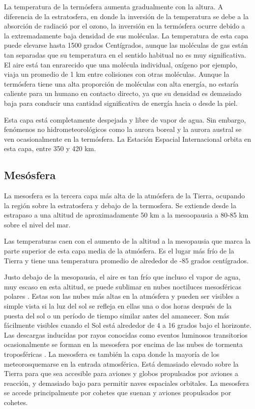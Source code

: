 \documentclass[12pt]{article}
\begin{document}
La temperatura de la termósfera aumenta gradualmente con la altura. A diferencia de la estratosfera, en donde la inversión de la temperatura se debe a la absorción de radiació por el ozono, la inversión en la termósfera  ocurre debido a la extremadamente baja densidad de sus moléculas. La temperatura de esta capa puede elevarse hasta 1500 grados Centígrados, aunque las moléculas de gas están tan separadas que su temperatura en el sentido habitual no es muy significativa. El aire está tan enrarecido que una molécula individual, oxígeno por ejemplo,  viaja un promedio de 1 km entre colisiones con otras moléculas. Aunque la termósfera tiene una alta proporción de moléculas con alta energía, no estaría caliente para un humano en contacto directo, ya que su densidad es demasiado baja para conducir una cantidad significativa de energía hacia o desde la piel.

Esta capa está completamente despejada y libre de vapor de agua. Sin embargo, fenómenos no hidrometeorológicos como la aurora boreal y la aurora austral se ven ocasionalmente en la termósfera. La Estación Espacial Internacional orbita en esta capa, entre 350 y 420 km.

\subsection{Mesósfera}

La mesosfera es la tercera capa más alta de la atmósfera de la Tierra, ocupando la región sobre la estratosfera y debajo de la termosfera. Se extiende desde la estrapaso a una altitud de aproximadamente 50 km a la mesoopausia a 80-85 km sobre el nivel del mar.

Las temperaturas caen con el aumento de la altitud a la mesopausia que marca la parte superior de esta capa media de la atmósfera. Es el lugar más frío de la Tierra y tiene una temperatura promedio de alrededor de -85 grados centígrados.

Justo debajo de la mesopausia, el aire es tan frío que incluso el vapor de agua, muy escaso en esta altitud, se puede sublimar en nubes noctiluces mesosféricas polares . Estas son las nubes más altas en la atmósfera y pueden ser visibles a simple vista si la luz del sol se refleja en ellas una o dos horas después de la puesta del sol o un período de tiempo similar antes del amanecer. Son más fácilmente visibles cuando el Sol está alrededor de 4 a 16 grados bajo el horizonte. Las descargas inducidas por rayos conocidas como eventos luminosos transitorios ocasionalmente se forman en la mesosfera por encima de las nubes de tormenta troposféricas . La mesosfera es también la capa donde la mayoría de los meteorosquemarse en la entrada atmosférica. Está demasiado elevado sobre la Tierra para que sea accesible para aviones y globos propulsados por aviones a reacción, y demasiado bajo para permitir naves espaciales orbitales. La mesosfera se accede principalmente por cohetes que suenan y aviones propulsados por cohetes.
\end{document}
